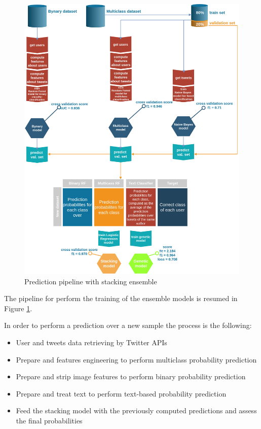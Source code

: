 \begin{figure}[htp!]
	\centering
	\includegraphics[width=\columnwidth]{chapter5/figure/stacking.png}
	\caption{Prediction pipeline with stacking ensemble}
	\label{fig:stacking_pipeline}
\end{figure}
The pipeline for perform the training of the ensemble models is resumed in Figure \ref{fig:stacking_pipeline}.

In order to perform a prediction over a new sample the process is the following:
\begin{itemize}
	\item[\PencilRight]User and tweets data retrieving by Twitter APIs
	\item[\PencilRight]Prepare and features engineering to perform multiclass probability prediction
	\item[\PencilRight]Prepare and strip image features to perform binary probability prediction
	\item[\PencilRight]Prepare and treat text to perform text-based probability prediction
	\item[\PencilRight]Feed the stacking model with the previously computed predictions and assess the final probabilities 
\end{itemize}

